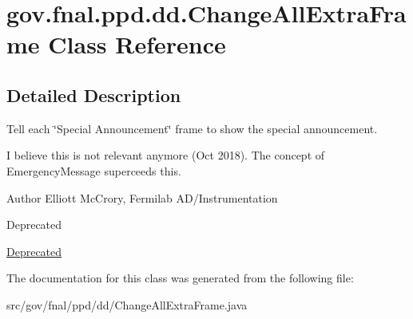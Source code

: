 \hypertarget{classgov_1_1fnal_1_1ppd_1_1dd_1_1ChangeAllExtraFrame}{\section{gov.\-fnal.\-ppd.\-dd.\-Change\-All\-Extra\-Frame Class Reference}
\label{classgov_1_1fnal_1_1ppd_1_1dd_1_1ChangeAllExtraFrame}
}


\subsection{Detailed Description}
Tell each \char`\"{}\-Special Announcement\char`\"{} frame to show the special announcement.

I believe this is not relevant anymore (Oct 2018). The concept of Emergency\-Message superceeds this.

\begin{DoxyAuthor}{Author}
Elliott Mc\-Crory, Fermilab A\-D/\-Instrumentation
\end{DoxyAuthor}
\begin{DoxyRefDesc}{Deprecated}
\item[\hyperlink{deprecated__deprecated000001}{Deprecated}]\end{DoxyRefDesc}


The documentation for this class was generated from the following file\-:\begin{DoxyCompactItemize}
\item 
src/gov/fnal/ppd/dd/Change\-All\-Extra\-Frame.\-java\end{DoxyCompactItemize}

